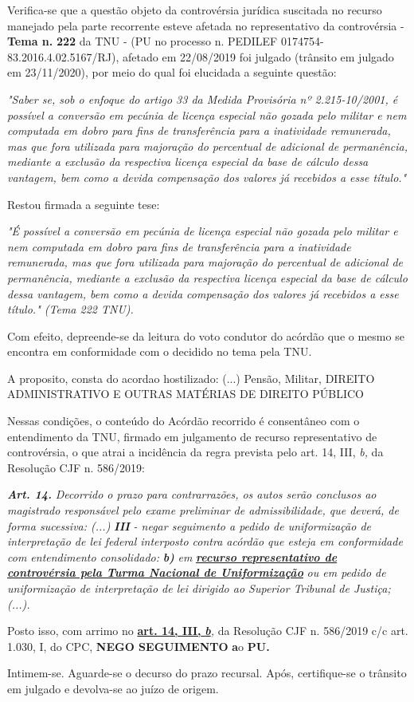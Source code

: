\documentclass[12pt]{article}
\begin{document}
\justifying
\noindent Verifica-se que a questão objeto da controvérsia jurídica suscitada no recurso manejado pela parte recorrente esteve afetada no representativo da controvérsia - \textbf{Tema n. }\textbf{222} da TNU - (PU no processo n. PEDILEF 0174754-83.2016.4.02.5167/RJ),  afetado em 22/08/2019 foi julgado (trânsito em julgado em 23/11/2020), por meio do qual foi elucidada a seguinte questão:

\noindent \textit{"Saber se, sob o enfoque do artigo 33 da Medida Provisória nº 2.215-10/2001, é possível a conversão em pecúnia de licença especial não gozada pelo militar e nem computada em dobro para fins de transferência para a inatividade remunerada, mas que fora utilizada para majoração do percentual de adicional de permanência, mediante a exclusão da respectiva licença especial da base de cálculo dessa vantagem, bem como a devida compensação dos valores já recebidos a esse título."}

\noindent Restou firmada a seguinte tese:

\noindent \textit{"É possível a conversão em pecúnia de licença especial não gozada pelo militar e nem computada em dobro para fins de transferência para a inatividade remunerada, mas que fora utilizada para majoração do percentual de adicional de permanência, mediante a exclusão da respectiva licença especial da base de cálculo dessa vantagem, bem como a devida compensação dos valores já recebidos a esse título." (Tema 222 TNU).}

\noindent Com efeito, depreende-se da leitura do voto condutor do acórdão que o mesmo se encontra em conformidade com o decidido no  tema pela TNU.

\noindent A proposito, consta do acordao hostilizado: (...) Pensão, Militar, DIREITO ADMINISTRATIVO E OUTRAS MATÉRIAS DE DIREITO PÚBLICO

\noindent Nessas condições, o conteúdo do Acórdão recorrido é consentâneo com o entendimento da TNU, firmado em julgamento de recurso representativo de controvérsia, o que atrai a incidência da regra prevista pelo art. 14, III, \textit{b,} da Resolução CJF n. 586/2019:

\noindent \textit{\textbf{Art. 14.}}\textit{ Decorrido o prazo para contrarrazões, os autos serão conclusos ao magistrado responsável pelo exame preliminar de admissibilidade, que deverá, de forma sucessiva: (...) }\textit{\textbf{III }}\textit{- negar seguimento a pedido de uniformização de interpretação de lei federal interposto contra acórdão que esteja em conformidade com entendimento consolidado: }\textit{\textbf{b)}}\textit{ em }\uline{\textit{\textbf{recurso representativo de controvérsia pela Turma Nacional de Uniformização}}}\textit{ ou em pedido de uniformização de interpretação de lei dirigido ao Superior Tribunal de Justiça;(...).}

\noindent Posto isso, com arrimo no \uline{\textbf{art. 14, III, }}\uline{\textit{\textbf{b}}}\textit{,} da Resolução CJF n. 586/2019 c/c art. 1.030, I, do CPC, \textbf{NEGO SEGUIMENTO }\textbf{a}o\textbf{ PU}\textbf{.}

\noindent Intimem-se. Aguarde-se o decurso do prazo recursal. Após, certifique-se o trânsito em julgado e devolva-se ao juízo de origem.
\end{document}
